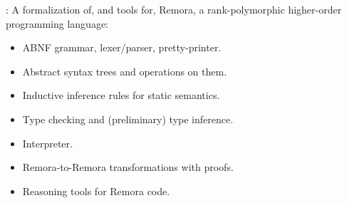 
\begin{frame}

\newlibtitle

:
A formalization of, and tools for, Remora,
a rank-polymorphic higher-order programming language:
\begin{itemize}
\item ABNF grammar, lexer/parser, pretty-printer.
\item Abstract syntax trees and operations on them.
\item Inductive inference rules for static semantics.
\item Type checking and (preliminary) type inference.
\item Interpreter.
\item Remora-to-Remora transformations with proofs.
\item Reasoning tools for Remora code.
\end{itemize}

\end{frame}



